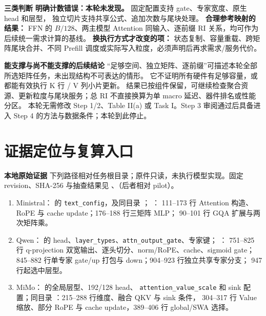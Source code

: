 \documentclass[11pt,a4paper,fontset=fandol]{ctexart}
\newcommand{\para}[1]{\par\smallskip\noindent\textbf{#1}\quad}
\begin{document}
\para{三类判断}
\textbf{明确计数错误：本轮未发现。} 固定配置支持 gate、专家宽度、原生 head 和层型，
独立切片支持共享公式、追加次数与尾块处理。
\textbf{合理参考映射的结果：} FFN 的 $B/128$、两主模型 Attention 同输入、逐前缀 RI 关系，均可作为后续统一需求计算的基线。
\textbf{换执行方式才改变的项：} 状态复制、容量重载、跨矩阵尾块合并、不同 Prefill 调度或实际写入粒度，必须声明后再求需求/服务代价。

\para{能支撑与尚不能支撑的后续结论}
“足够空间、独立矩阵、逐前缀”可描述本轮全部所选矩阵任务，未出现结构不可表达的情形。
它不证明所有硬件有足够容量，或都能有效执行 K 行 / V 列小片更新。
结果已按组件保留，可继续检查聚合资源、更新粒度与尾块服务；总 RI 不直接换算为单 macro 延迟、器件排名或性能分区。
本轮无需修改 Step 1/2、Table II(a) 或 Task I。Step 3 审阅通过后具备进入 Step 4 的方法与数据条件；本轮到此停止。

\clearpage
\section{证据定位与复算入口}
\para{本地原始证据}
下列路径相对任务根目录；原件只读，未执行模型实现。固定 revision、SHA-256 与抽查结果见
、（后者相对 pilot）。
\begin{enumerate}\raggedright
\item Ministral： 的
\texttt{text\_config}，及同目录 ；
：
111--173 行 Attention 构造、RoPE 与 cache update；176--188 行三矩阵 MLP；
90--101 行 GQA 扩展与两次矩阵乘。
\item Qwen： 的
head、\texttt{layer\_types}、\texttt{attn\_output\_gate}、专家键；
：
751--825 行 q-projection 双宽输出、逐头切分、norm/RoPE、cache、sigmoid gate；
845--882 行单专家 gate/up 打包与 down；904--923 行独立共享专家分支；
947 行起选中层型。
\item MiMo： 的全局层型、192/128 head、
\texttt{attention\_value\_scale} 和 sink 配置；同目录
：215--288 行维度、融合 QKV 与 sink 条件，
304--317 行 Value 缩放、部分 RoPE 与 cache update，389--406 行 global/SWA 选择。
\end{enumerate}
\end{document}
